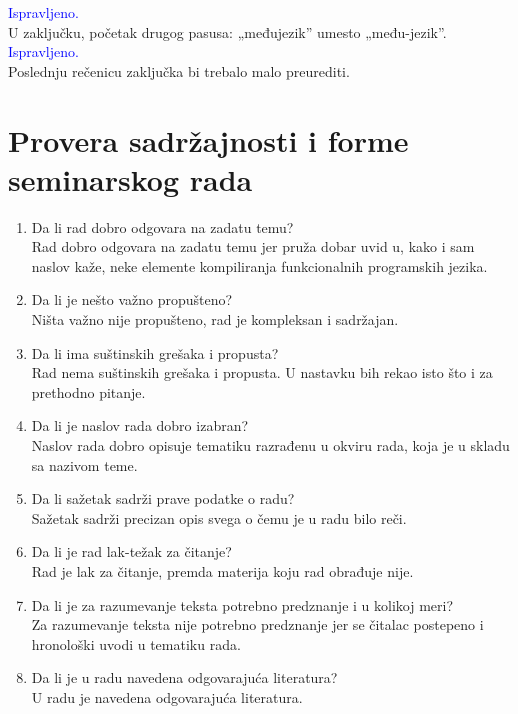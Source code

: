 \documentclass[a4paper]{report}
\newcommand{\odgovor}[1]{\textcolor{blue}{#1}}
\begin{document}
\odgovor{Ispravljeno.}\\

U zaključku, početak drugog pasusa: „međujezik” umesto „među-jezik”.\\

\odgovor{Ispravljeno.}\\

Poslednju rečenicu zaključka bi trebalo malo preurediti.\\

\section{Provera sadržajnosti i forme seminarskog rada}

\begin{enumerate}
\item Da li rad dobro odgovara na zadatu temu?\\
Rad dobro odgovara na zadatu temu jer pruža dobar uvid u, kako i sam naslov kaže, neke elemente kompiliranja funkcionalnih programskih jezika.
\item Da li je nešto važno propušteno?\\
Ništa važno nije propušteno, rad je kompleksan i sadržajan.
\item Da li ima suštinskih grešaka i propusta?\\
Rad nema suštinskih grešaka i propusta. U nastavku bih rekao isto što i za prethodno pitanje.
\item Da li je naslov rada dobro izabran?\\
Naslov rada dobro opisuje tematiku razrađenu u okviru rada, koja je u skladu sa nazivom teme.
\item Da li sažetak sadrži prave podatke o radu?\\
Sažetak sadrži precizan opis svega o čemu je u radu bilo reči.
\item Da li je rad lak-težak za čitanje?\\
Rad je lak za čitanje, premda materija koju rad obrađuje nije.
\item Da li je za razumevanje teksta potrebno predznanje i u kolikoj meri?\\
Za razumevanje teksta nije potrebno predznanje jer se čitalac postepeno i hronološki uvodi u tematiku rada.
\item Da li je u radu navedena odgovarajuća literatura?\\
U radu je navedena odgovarajuća literatura.

\end{enumerate}
\end{document}
